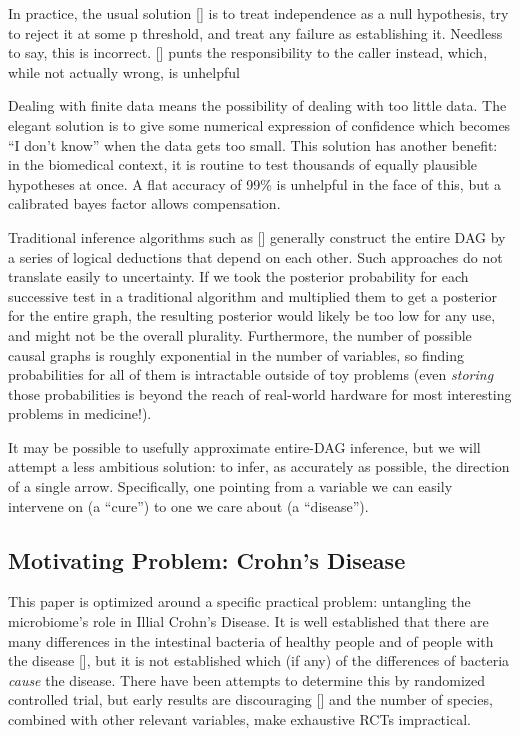 \documentclass[letterpaper]{article}
\begin{document}
In practice, the usual solution [\cite{akelleh,pcalg}] is to treat independence as a null
hypothesis, try to reject it at some p threshold, and treat any
failure as establishing it.  Needless to say, this is incorrect.
[\cite{bayesnet}] punts the responsibility to the caller instead,
which, while not actually wrong, is unhelpful

Dealing with finite data means the possibility of dealing with too
little data.  The elegant solution is to give some numerical
expression of confidence which becomes ``I don't know'' when the data
gets too small.  This solution has another benefit: in the biomedical
context, it is routine to test thousands of equally plausible
hypotheses at once.  A flat accuracy of 99\% is unhelpful in the face
of this, but a calibrated bayes factor allows compensation.

Traditional inference algorithms such as [\cite{Pearl}] generally
construct the entire DAG by a series of logical deductions that depend
on each other.  Such approaches do not translate easily to
uncertainty.  If we took the posterior probability for each
successive test in a traditional algorithm and multiplied them to get
a posterior for the entire graph, the resulting posterior would likely
be too low for any use, and might not be the overall plurality.
Furthermore, the number of possible causal graphs is roughly
exponential in the number of variables, so finding probabilities for
all of them is intractable outside of toy problems (even
\textit{storing} those probabilities is beyond the reach of real-world
hardware for most interesting problems in medicine!).

It may be possible to usefully approximate entire-DAG inference, but
we will attempt a less ambitious solution: to infer, as accurately as
possible, the direction of a single arrow.  Specifically, one pointing
from a variable we can easily intervene on (a ``cure'') to one we care
about (a ``disease'').

\subsection{Motivating Problem: Crohn's Disease}

This paper is optimized around a specific practical problem:
untangling the microbiome's role in Illial Crohn's Disease.  It is
well established that there are many differences in the intestinal
bacteria of healthy people and of people with the disease
[\cite{hofer}], but it is not established which (if any) of the differences of
bacteria \textit{cause} the disease.  
There have been attempts to determine this by randomized controlled
trial, but early results are discouraging [\cite{rctma}] and the number
of species, combined with other relevant
variables, make exhaustive RCTs impractical.
\end{document}
